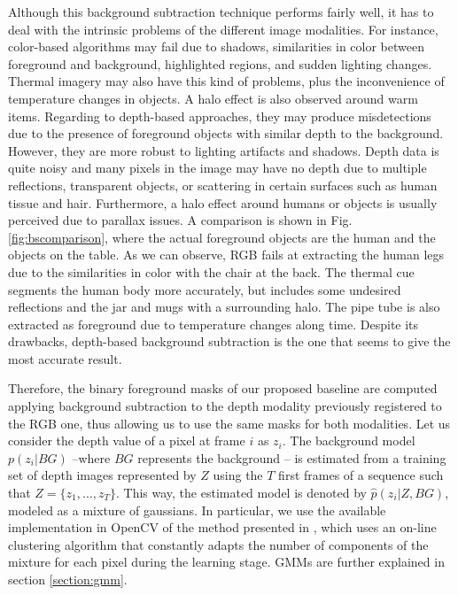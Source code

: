 \documentclass[10pt,twocolumn,letterpaper]{article}
\begin{document}
Although this background subtraction technique performs fairly well, it has to deal with the intrinsic problems of the different image modalities. For instance, color-based algorithms may fail due to shadows, similarities in color between foreground and background, highlighted regions, and sudden lighting changes. Thermal imagery may also have this kind of problems, plus the inconvenience of temperature changes in objects. A halo effect is also observed around warm items. Regarding to depth-based approaches, they may produce misdetections due to the presence of foreground objects with similar depth to the background. However, they are more robust to lighting artifacts and shadows. Depth data is quite noisy and many pixels in the image may have no depth due to multiple reflections, transparent objects, or scattering in certain surfaces such as human tissue and hair. Furthermore, a halo effect around humans or objects is usually perceived due to parallax issues. A comparison is shown in Fig. \ref{fig:bscomparison}, where the actual foreground objects are the human and the objects on the table. As we can observe, RGB fails at extracting the human legs due to the similarities in color with the chair at the back. The thermal cue segments the human body more accurately, but includes some undesired reflections and the jar and mugs with a surrounding halo. The pipe tube is also extracted as foreground due to temperature changes along time. Despite its drawbacks, depth-based background subtraction is the one that seems to give the most accurate result. 

Therefore, the binary foreground masks of our proposed baseline are computed applying background subtraction to the depth modality previously registered to the RGB one, thus allowing us to use the same masks for both modalities.  Let us consider the depth value of a pixel at frame $i$ as $z_i$. The background model $p(z_i|BG)$ --where $BG$ represents the background -- is estimated from a training set of depth images represented by $Z$ using the $T$ first frames of a sequence such that $Z = \{z_1, \ldots, z_T\}$. This way, the estimated model is denoted by $\hat{p}(z_i| Z, BG)$, modeled as a mixture of gaussians. In particular, we use the available implementation in OpenCV of the method presented in \cite{zivkovic2004improved}, which uses an on-line clustering algorithm that constantly adapts the number of components of the mixture for each pixel during the learning stage. GMMs are further explained in section \ref{section:gmm}.
\end{document}
